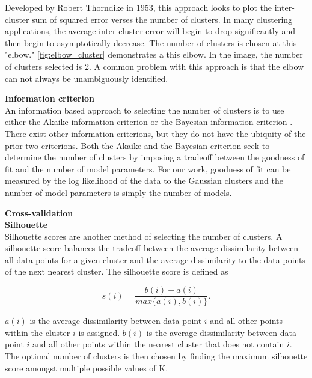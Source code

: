 Developed by Robert Thorndike \cite{Thorndike1953} in 1953, this approach looks to plot the inter-cluster sum of squared error verses the number of clusters.  In many clustering applications, the average inter-cluster error will begin to drop significantly and then begin to asymptotically decrease.  The number of clusters is chosen at this "elbow."  \ref{fig:elbow_cluster} demonstrates a this elbow.  In the image, the number of clusters selected is 2.  A common problem with this approach is that the elbow can not always be unambiguously identified.

\bigskip
\noindent
\textbf{Information criterion} \\
An information based approach to selecting the number of clusters is to use either the Akaike information criterion \cite{Akaike1974} or the Bayesian information criterion \cite{Schwarz1978}.  There exist other information criterions, but they do not have the ubiquity of the prior two criterions.  Both the Akaike and the Bayesian criterion seek to determine the number of clusters by imposing a tradeoff between the goodness of fit and the number of model parameters.  For our work, goodness of fit can be measured by the log likelihood of the data to the Gaussian clusters and the number of model parameters is simply the number of models.  

\bigskip
\noindent
\textbf{Cross-validation} \\



\bigskip
\noindent
\textbf{Silhouette} \\
Silhouette \cite{Rousseuw1987} scores are another method of selecting the number of clusters.  A silhouette score balances the tradeoff between the average dissimilarity between all data points for a given cluster and the average dissimilarity to the data points of the next nearest cluster.  The silhouette score is defined as

\begin{equation}
s(i) = \frac{b(i) - a(i)}{max\{a(i), b(i)\}}.
\end{equation}

$a(i)$ is the average dissimilarity between data point $i$ and all other points within the cluster $i$ is assigned.  $b(i)$ is the average dissimilarity between data point $i$ and all other points within the nearest cluster that does not contain $i$.  The optimal number of clusters is then chosen by finding the maximum silhouette score amongst multiple possible values of K.

